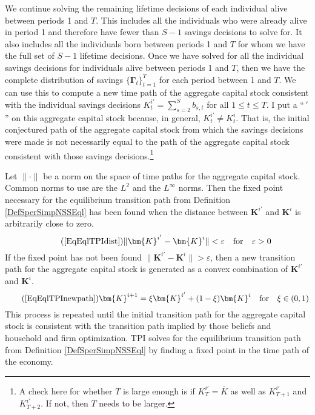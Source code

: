 \documentclass[letterpaper,12pt]{article}
\theoremstyle{definition}
\numberwithin{equation}{section}
\numberwithin{exercise}{section}
\providecommand{\norm}[1]{\lVert#1\rVert}
\newcommand{\ve}{\varepsilon}
\begin{document}
\begin{spacing}{1.5}
      We continue solving the remaining lifetime decisions of each individual alive between periods 1 and $T$. This includes all the individuals who were already alive in period 1 and therefore have fewer than $S-1$ savings decisions to solve for. It also includes all the individuals born between periods 1 and $T$ for whom we have the full set of $S-1$ lifetime decisions. Once we have solved for all the individual savings decisions for individuals alive between periods 1 and $T$, then we have the complete distribution of savings $\{\bm{\Gamma}_t\}_{t=1}^T$ for each period between 1 and $T$. We can use this to compute a new time path of the aggregate capital stock consistent with the individual savings decisions $K_t^{i'} = \sum_{s=2}^S b_{s,t}$ for all $1\leq t\leq T$. I put a ``$\, ' \,$'' on this aggregate capital stock because, in general, $K_t^{i'}\neq K_t^i$. That is, the initial conjectured path of the aggregate capital stock from which the savings decisions were made is not necessarily equal to the path of the aggregate capital stock consistent with those savings decisions.\footnote{A check here for whether $T$ is large enough is if $K_T^{i'}=\bar{K}$ as well as $K_{T+1}^{i'}$ and $K_{T+2}^{i'}$. If not, then $T$ needs to be larger.}

      Let $\norm{\cdot}$ be a norm on the space of time paths for the aggregate capital stock. Common norms to use are the $L^2$ and the $L^\infty$ norms. Then the fixed point necessary for the equilibrium transition path from Definition \ref{DefSperSimpNSSEql} has been found when the distance between $\bm{K}^{i'}$ and $\bm{K}^{i}$ is arbitrarily close to zero.
      \begin{equation}\tag{\ref{EqEqlTPIdist}}
         \norm{\bm{K}^{i'} - \bm{K}^{i}} < \ve \quad\text{for}\quad \ve>0
      \end{equation}
      If the fixed point has not been found $\norm{\bm{K}^{i'} - \bm{K}^{i}} > \ve$, then a new transition path for the aggregate capital stock is generated as a convex combination of $\bm{K}^{i'}$ and $\bm{K}^{i}$.
      \begin{equation}\tag{\ref{EqEqlTPInewpath}}
         \bm{K}^{i+1} = \xi\bm{K}^{i'} + (1-\xi)\bm{K}^{i} \quad\text{for}\quad \xi\in(0,1)
      \end{equation}
      This process is repeated until the initial transition path for the aggregate capital stock is consistent with the transition path implied by those beliefs and household and firm optimization. TPI solves for the equilibrium transition path from Definition \ref{DefSperSimpNSSEql} by finding a fixed point in the time path of the economy.



\end{spacing}
\end{document}
